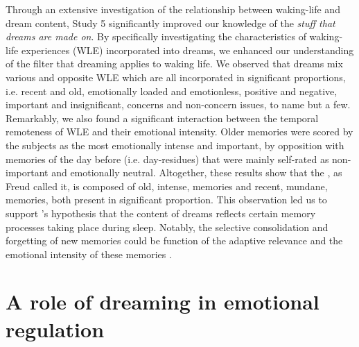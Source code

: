 Through an extensive investigation of the relationship between waking-life and dream content, Study 5 significantly improved our knowledge of the \emph{stuff that dreams are made on}. By specifically investigating the characteristics of waking-life experiences (WLE) incorporated into dreams, we enhanced our understanding of the filter that dreaming applies to waking life. We observed that dreams mix various and opposite WLE which are all incorporated in significant proportions, i.e. recent and old, emotionally loaded and emotionless, positive and negative, important and insignificant, concerns and non-concern issues, to name but a few. Remarkably, we also found a significant interaction between the temporal remoteness of WLE and their emotional intensity. Older memories were scored by the subjects as the most emotionally intense and important, by opposition with memories of the day before (i.e. day-residues) that were mainly self-rated as non-important and emotionally neutral. Altogether, these results show that the , as Freud called it, is composed of old, intense, memories and recent, mundane, memories, both present in significant proportion. This observation led us to support \citet{payne_sleep_2004}'s hypothesis that the content of dreams reflects certain memory processes taking place during sleep. Notably, the selective consolidation and forgetting of new memories could be function of the adaptive relevance and the emotional intensity \citep{} of these memories \citep{schwartz_are_2003, malinowski_memory_2014}.

\section{A role of dreaming in emotional regulation}
\label{disc:drf:summary:regulation}

